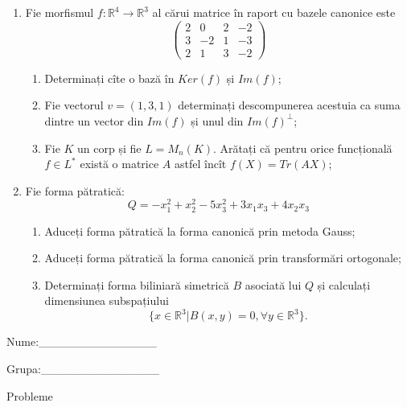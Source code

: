 \documentclass{article}
\begin{document}
\begin{enumerate}
 \item Fie morfismul $f:\mathbb{R}^4 \to \mathbb{R}^3$ al cărui matrice în raport cu bazele canonice este
$$\begin{pmatrix}
2&0&2&-2\\
3&-2&1&-3\\
2&1&3&-2
\end{pmatrix}$$

\begin{enumerate}
\item Determinați cîte o bază în $Ker(f)$ și $Im(f)$;
\item Fie vectorul $v=(1,3,1)$ determinați descompunerea acestuia ca suma dintre un vector din $Im(f)$ și unul din $Im(f)^\perp$;
\item Fie $K$ un corp și fie $L=M_n(K)$. Arătați că pentru orice funcțională $f \in L^*$ există o matrice $A$ astfel încît $f(X)=Tr(AX)$;
\end{enumerate}
\item Fie forma pătratică:
$$Q= -x_1^2+x_2^2-5x_3^2+3x_1x_3+4x_2x_3$$

\begin{enumerate}
\item Aduceți forma pătratică la forma canonică prin metoda Gauss;
\item Aduceți forma pătratică la forma canonică prin transformări ortogonale;
\item Determinați forma biliniară simetrică $B$ asociată lui $Q$ și calculați dimensiunea subspațiului
$$\{x \in \mathbb{R}^3 | B(x,y)=0,\forall y \in \mathbb{R}^3\}.$$

\end{enumerate}
\end{enumerate}
\newpage
\begin{flushright}
Nume:\_\_\_\_\_\_\_\_\_\_\_\_\_\_
 
 
Grupa:\_\_\_\_\_\_\_\_\_\_\_\_\_\_
\end{flushright}
\begin{center}
\vspace{2cm}
{\Large Probleme}
\vspace{2cm}
\end{center}
\end{document}
